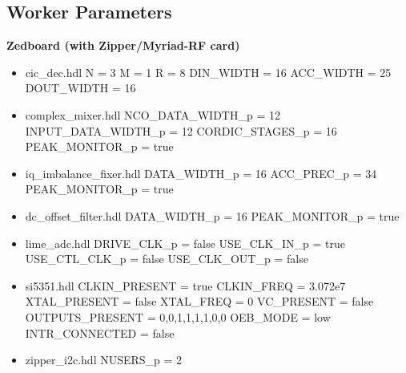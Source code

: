 \subsection{Worker Parameters}
\begin{minipage}[t]{.5\textwidth}
	\textbf{Zedboard (with Zipper/Myriad-RF card)}
	\begin{itemize}
		\item cic\_dec.hdl
			\subitem N = 3
			\subitem M = 1
			\subitem R = 8
			\subitem DIN\_WIDTH = 16
			\subitem ACC\_WIDTH = 25
			\subitem DOUT\_WIDTH = 16
		\item complex\_mixer.hdl
			\subitem NCO\_DATA\_WIDTH\_p = 12
			\subitem INPUT\_DATA\_WIDTH\_p = 12
			\subitem CORDIC\_STAGES\_p = 16
			\subitem PEAK\_MONITOR\_p = true
		\item iq\_imbalance\_fixer.hdl
			\subitem DATA\_WIDTH\_p = 16
			\subitem ACC\_PREC\_p = 34
			\subitem PEAK\_MONITOR\_p = true
		\item dc\_offset\_filter.hdl
			\subitem DATA\_WIDTH\_p = 16
			\subitem PEAK\_MONITOR\_p = true
		\item lime\_adc.hdl
			\subitem DRIVE\_CLK\_p = false
			\subitem USE\_CLK\_IN\_p = true
			\subitem USE\_CTL\_CLK\_p = false
			\subitem USE\_CLK\_OUT\_p = false
		\item si5351.hdl
			\subitem CLKIN\_PRESENT = true
			\subitem CLKIN\_FREQ = 3.072e7
			\subitem XTAL\_PRESENT = false
			\subitem XTAL\_FREQ = 0
			\subitem VC\_PRESENT = false
			\subitem OUTPUTS\_PRESENT = 0,0,1,1,1,1,0,0
			\subitem OEB\_MODE = low
			\subitem INTR\_CONNECTED = false
		\item zipper\_i2c.hdl
			\subitem NUSERS\_p = 2
	\end{itemize}
\end{minipage}
